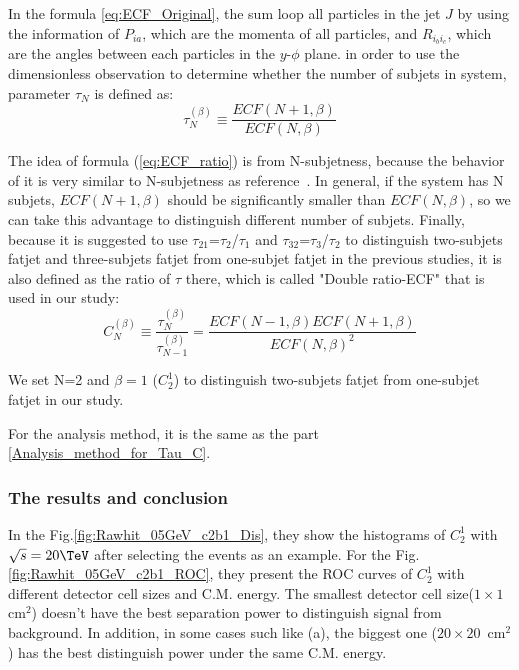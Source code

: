 \documentclass[12pt,twoside,a4paper,an,final]{cms-tdr}
\begin{document}
In the formula \ref{eq:ECF_Original}, the sum loop all particles in the jet $J$ by using the information of $P_{ia}$, which are the momenta of all particles, and $R_{i_{b}i_{c}}$, which are the angles between each particles in the $y$-$\phi$ plane.  in order to use the dimensionless observation to determine whether the number of subjets in system, parameter $\tau_{N}$ is defined as:\\
\begin{equation} \label{eq:ECF_ratio}
\tau_{N}^{(\beta)}\equiv\frac{ECF(N+1,\beta)}{ECF(N,\beta)}
\end{equation}

The idea of formula (\ref{eq:ECF_ratio}) is from N-subjetness, because the behavior of it is very similar to N-subjetness as reference~\cite{Larkoski:2013eya}. In general, if the system has N subjets, $ECF(N+1,\beta)$ should be significantly smaller than $ECF(N,\beta)$, so we can take this advantage to distinguish different number of subjets. Finally, because it is suggested to use $\tau_{21}$=$\tau_{2}$/$\tau_{1}$  and $\tau_{32}$=$\tau_{3}$/$\tau_{2}$ to distinguish two-subjets fatjet and three-subjets fatjet from one-subjet fatjet in the previous studies, it is also defined as the ratio of $\tau$ there, which is called "Double ratio-ECF" that is used in our study:\\
\begin{equation}
C_{N}^{(\beta)}\equiv\frac{\tau_{N}^{(\beta)}}{\tau_{N-1}^{(\beta)}}=\frac{ECF(N-1,\beta)ECF(N+1,\beta)}{ECF(N,\beta)^2}
\end{equation}

We set N=2 and $\beta=1$ ($C_{2}^{1}$) to distinguish two-subjets fatjet from one-subjet fatjet in our study.

For the analysis method, it is the same as the part \ref{Analysis_method_for_Tau_C}.

\subsubsection{The results and conclusion}
In the Fig.\ref{fig:Rawhit_05GeV_c2b1_Dis}, they show the histograms of $C_{2}^{1}$ with $\sqrt{s} = 20\TeV$ after selecting the events as an example. For the Fig.\ref{fig:Rawhit_05GeV_c2b1_ROC}, they present the ROC curves of $C_{2}^{1}$ with different detector cell sizes and C.M. energy. The smallest detector cell size($1 \times 1$~$\mathrm{cm}^2$) doesn't have the best separation power to distinguish signal from background. In addition, in some cases such like (a), the biggest one ($20 \times 20$~$\mathrm{cm}^2$) has the best distinguish power under the same C.M. energy.\\
\end{document}
